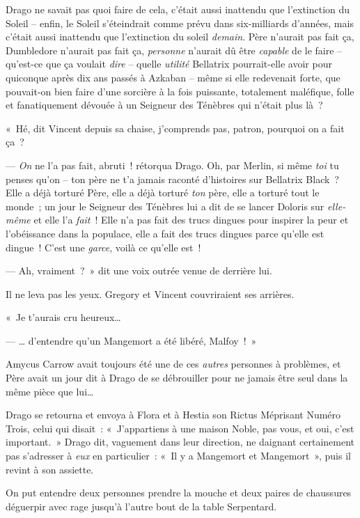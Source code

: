 Drago ne savait pas quoi faire de cela, c'était aussi inattendu que l'extinction du Soleil -- enfin, le Soleil s'éteindrait comme prévu dans six-milliards d'années, mais c'était aussi inattendu que l'extinction du soleil \emph{demain}.
Père n'aurait pas fait ça, Dumbledore n'aurait pas fait ça, \emph{personne} n'aurait dû être \emph{capable} de le faire -- qu'est-ce que ça voulait \emph{dire} -- quelle \emph{utilité} Bellatrix pourrait-elle avoir pour quiconque après dix ans passés à Azkaban -- même si elle redevenait forte, que pouvait-on bien faire d'une sorcière à la fois puissante, totalement maléfique, folle et fanatiquement dévouée à un Seigneur des Ténèbres qui n'était plus là~?

«~Hé, dit Vincent depuis sa chaise, j'comprends pas, patron, pourquoi on a fait ça~?

--- \emph{On} ne l'a pas fait, abruti~! rétorqua Drago.
Oh, par Merlin, si même \emph{toi} tu penses qu'on -- ton père ne t'a jamais raconté d'histoires sur Bellatrix Black~?
Elle a déjà torturé Père, elle a déjà torturé \emph{ton} père, elle a torturé tout le monde~; un jour le Seigneur des Ténèbres lui a dit de se lancer Doloris sur \emph{elle-même} et elle l'a \emph{fait}~!
Elle n'a pas fait des trucs dingues pour inspirer la peur et l'obéissance dans la populace, elle a fait des trucs dingues parce qu'elle est dingue~!
C'est une \emph{garce}, voilà ce qu'elle est~!

--- Ah, vraiment~?~»
dit une voix outrée venue de derrière lui.

Il ne leva pas les yeux.
Gregory et Vincent couvriraient ses arrières.

«~Je t'aurais cru heureux…

--- … d'entendre qu'un Mangemort a été libéré, Malfoy~!~»

Amycus Carrow avait toujours été une de ces \emph{autres} personnes à problèmes, et Père avait un jour dit à Drago de se débrouiller pour ne jamais être seul dans la même pièce que lui…

Drago se retourna et envoya à Flora et à Hestia son Rictus Méprisant Numéro Trois, celui qui disait~: «~J'appartiens à une maison Noble, pas vous, et oui, c'est important.~»
Drago dit, vaguement dans leur direction, ne daignant certainement pas s'adresser à \emph{eux} en particulier~: «~Il y a Mangemort et Mangemort~», puis il revint à son assiette.

On put entendre deux personnes prendre la mouche et deux paires de chaussures déguerpir avec rage jusqu'à l'autre bout de la table Serpentard.

